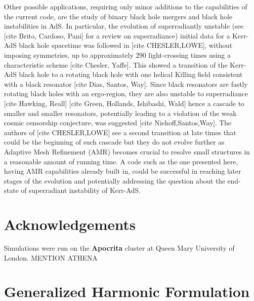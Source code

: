 \documentclass[a4paper,11pt]{article}
\begin{document}
Other possible applications, requiring only minor additions to the capabilities of the current code, are the study of binary black hole mergers and black hole instabilities in AdS. In particular, the evolution of superradiantly unstable (see [cite Brito, Cardoso, Pani] for a review on superradiance) initial data for a Kerr-AdS black hole spacetime was followed in [cite CHESLER,LOWE], without imposing symmetries, up to approximately 290 light-crossing times using a characteristic scheme [cite Chesler, Yaffe]. This showed a transition of the Kerr-AdS black hole to a rotating black hole with one helical Killing field consistent with a black resonator [cite Dias, Santos, Way]. Since black resonators are fastly rotating black holes with an ergo-region, they are also unstable to superradiance [cite  Hawking, Reall] [cite Green, Hollands, Ishibashi, Wald] hence a cascade to smaller and smaller resonators, potentially leading to a violation of the weak cosmic censorship conjecture, was suggested [cite Niehoff,Santos,Way]. The authors of [cite CHESLER,LOWE] see a second transition at late times that could be the beginning of such cascade but they do not evolve further as Adaptive Mesh Refinement (AMR) becomes crucial to resolve small structures in a reasonable amount of running time. A code such as the one presented here, having AMR capabilities already built in, could be successful in reaching later stages of the evolution and potentially addressing the question about the end-state of superradiant instability of Kerr-AdS.



\section*{Acknowledgements}
Simulations were run on the {\bf Apocrita} cluster at Queen Mary University of London. MENTION ATHENA

\appendix
\setcounter{tocdepth}{1}
\section{Generalized Harmonic Formulation}
\label{sec:GHfor}
\end{document}
